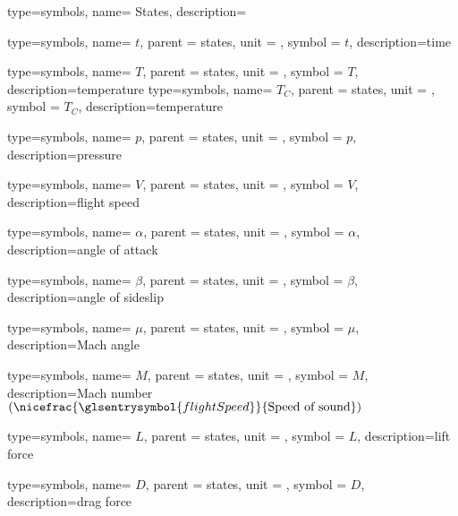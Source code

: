 {type=symbols,
  name= {States},
  description={}
}

{type=symbols,
  name= \ensuremath{t},
  parent = {states},
  unit = \unexpanded{\si{\second}},
  symbol = \ensuremath{t},
  description={time}
}

{type=symbols,
  name= \ensuremath{T},
  parent = {states},
  unit = \unexpanded{\si{\kelvin}},
  symbol = \ensuremath{T},
  description={temperature}
}
{type=symbols,
  name= \ensuremath{T_{C}},
  parent = {states},
  unit = \unexpanded{\si{\celsius}},
  symbol = \ensuremath{T_{C}},
  description={temperature}
}

{type=symbols,
  name= \ensuremath{p},
  parent = {states},
  unit = \unexpanded{\si{\pascal}},
  symbol = \ensuremath{p},
  description={pressure}
}

{type=symbols,
  name= \ensuremath{V},
  parent = {states},
  unit = \unexpanded{\si{\meter\per\second}},
  symbol = \ensuremath{V},
  description={flight speed}
}

{type=symbols,
  name= \ensuremath{\alpha},
  parent = {states},
  unit = \unexpanded{\si{\radian}},
  symbol = \ensuremath{\alpha},
  description={angle of attack}
}

{type=symbols,
  name= \ensuremath{\beta},
  parent = {states},
  unit = \unexpanded{\si{\radian}},
  symbol = \ensuremath{\beta},
  description={angle of sideslip}
}


{type=symbols,
  name= \ensuremath{\mu},
  parent = {states},
  unit = \unexpanded{\si{\radian}},
  symbol = \ensuremath{\mu},
  description={Mach angle}
}

{type=symbols,
  name= \ensuremath{M},
  parent = {states},
  unit = \unexpanded{},
  symbol = \ensuremath{M},
  description={Mach number $(\nicefrac{\glsentrysymbol{flightSpeed}}{\text{Speed of sound}})$}
}

{type=symbols,
  name= \ensuremath{L},
  parent = {states},
  unit = \unexpanded{\si{\newton}},
  symbol = \ensuremath{L},
  description={lift force}
}

{type=symbols,
  name= \ensuremath{D},
  parent = {states},
  unit = \unexpanded{\si{\newton}},
  symbol = \ensuremath{D},
  description={drag force}
}


